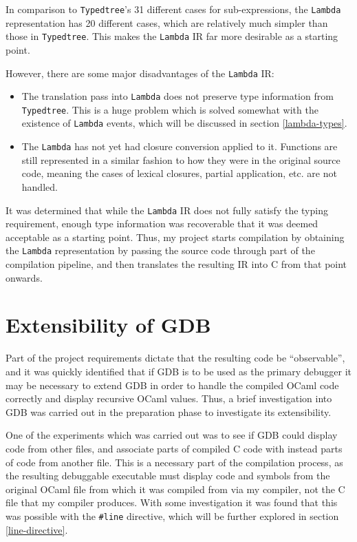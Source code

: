 \documentclass[12pt,a4paper,twoside,openright]{report}
\begin{document}
In comparison to \texttt{Typedtree}'s 31 different cases for sub-expressions, 
the \texttt{Lambda} representation has 20 different cases, which are relatively 
much simpler than those in \texttt{Typedtree}. This makes the \texttt{Lambda} 
IR far more desirable as a starting point.

However, there are some major disadvantages of the \texttt{Lambda} IR:

\begin{itemize}
\item The translation pass into \texttt{Lambda} does not preserve type 
information from \texttt{Typedtree}. This is a huge problem which is solved 
somewhat with the existence of \texttt{Lambda} events, which will be discussed 
in section \ref{lambda-types}.
\item The \texttt{Lambda} has not yet had closure conversion applied to it. 
Functions are still represented in a similar fashion to how they were in the 
original source code, meaning the cases of lexical closures, partial 
application, etc. are not handled.
\end{itemize}

It was determined that while the \texttt{Lambda} IR does not fully satisfy the 
typing requirement, enough type information was recoverable that it was deemed 
acceptable as a starting point. Thus, my project starts compilation by 
obtaining the \texttt{Lambda} representation by passing the source code through 
part of the compilation pipeline, and then translates the resulting IR into C 
from that point onwards.

\section{Extensibility of GDB}

Part of the project requirements dictate that the resulting code be 
``observable'', and it was quickly identified that if GDB is to be used as the 
primary debugger it may be necessary to extend GDB in order to handle the 
compiled OCaml code correctly and display recursive OCaml values. Thus, a brief 
investigation into GDB was carried out in the preparation phase to investigate 
its extensibility.

One of the experiments which was carried out was to see if GDB could display 
code from other files, and associate parts of compiled C code with instead 
parts of code from another file. This is a necessary part of the compilation 
process, as the resulting debuggable executable must display code and symbols 
from the original OCaml file from which it was compiled from via my compiler, 
not the C file that my compiler produces. With some investigation it was found 
that this was possible with the \texttt{\#}\texttt{line} directive, which will 
be further explored in section \ref{line-directive}.
\end{document}
